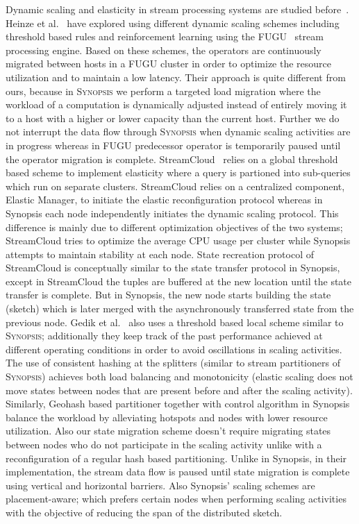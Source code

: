 Dynamic scaling and elasticity in stream processing systems are studied before~\cite{heinze2014auto, gulisano2012streamcloud, castro2013integrating, loesing2012stormy, heinze2013elastic, schneider2009elastic}.
Heinze et al.~\cite{heinze2014auto} have explored using different dynamic scaling schemes including threshold based rules and reinforcement learning using the FUGU~\cite{heinze2013elastic} stream processing engine.
Based on these schemes, the operators are continuously migrated between hosts in a FUGU cluster in order to optimize the resource utilization and to maintain a low latency.
Their approach is quite different from ours, because in \textsc{Synopsis} we perform a targeted load migration where the workload of a computation is dynamically adjusted instead of entirely moving it to a host with a higher or lower capacity than the current host.
Further we do not interrupt the data flow through \textsc{Synopsis} when dynamic scaling activities are in progress whereas in FUGU predecessor operator is temporarily paused until the operator migration is complete. 
StreamCloud~\cite{gulisano2012streamcloud} relies on a global threshold based scheme to implement elasticity where a query is partioned into sub-queries which run on separate clusters.
StreamCloud relies on a centralized component, Elastic Manager, to initiate the elastic reconfiguration protocol whereas in Synopsis each node independently initiates the dynamic scaling protocol.
This difference is mainly due to different optimization objectives of the two systems; StreamCloud tries to optimize the average CPU usage per cluster while Synopsis attempts to maintain stability at each node.
State recreation protocol of StreamCloud is conceptually similar to the state transfer protocol in Synopsis, except in StreamCloud the tuples are buffered at the new location until the state transfer is complete.
But in Synopsis, the new node starts building the state (sketch) which is later merged with the asynchronously transferred state from the previous node.
Gedik et al.~\cite{schneider2009elastic} also uses a threshold based local scheme similar to \textsc{Synopsis}; additionally they keep track of the past performance achieved at different operating conditions in order to avoid oscillations in scaling activities.
The use of consistent hashing at the splitters (similar to stream partitioners of \textsc{Synopsis}) achieves both load balancing and monotonicity (elastic scaling does not move states between nodes that are present before and after the scaling activity).
Similarly, Geohash based partitioner together with control algorithm in Synopsis balance the workload by alleviating hotspots and nodes with lower resource utilization.
Also our state migration scheme doesn't require migrating states between nodes who do not participate in the scaling activity unlike with a reconfiguration of a regular hash based partitioning.
Unlike in Synopsis, in their implementation, the stream data flow is paused until state migration is complete using vertical and horizontal barriers.
Also Synopsis' scaling schemes are placement-aware; which prefers certain nodes when performing scaling activities with the objective of reducing the span of the distributed sketch.

